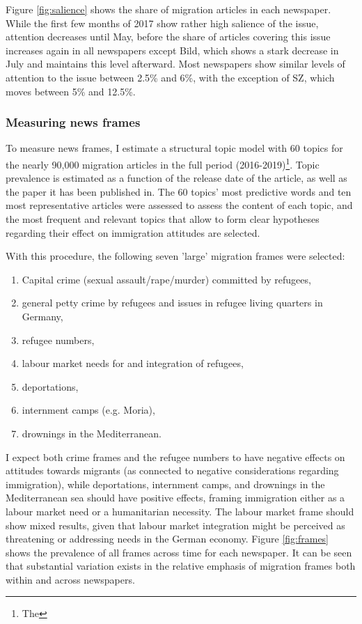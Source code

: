 \documentclass{article}
\begin{document}
Figure \ref{fig:salience} shows the share of migration articles in each newspaper. While the first few months of 2017 show rather high salience of the issue, attention decreases until May, before the share of articles covering this issue increases again in all newspapers except Bild, which shows a stark decrease in July and maintains this level afterward. Most newspapers show similar levels of attention to the issue between 2.5\% and 6\%, with the exception of SZ, which moves between 5\% and 12.5\%.

\subsubsection{Measuring news frames}

To measure news frames, I estimate a structural topic model with 60 topics for the nearly 90,000 migration articles in the full period (2016-2019)\footnote{The }. Topic prevalence is estimated as a function of the release date of the article, as well as the paper it has been published in. The 60 topics' most predictive words and ten most representative articles were assessed to assess the content of each topic, and the most frequent and relevant topics that allow to form clear hypotheses regarding their effect on immigration attitudes are selected. 

With this procedure, the following seven 'large' migration frames were selected:

\begin{enumerate}
    \item Capital crime (sexual assault/rape/murder) committed by refugees, 
    \item general petty crime by refugees and issues in refugee living quarters in Germany,
    \item refugee numbers,
    \item labour market needs for and integration of refugees,
    \item deportations,
    \item internment camps (e.g. Moria),
    \item drownings in the Mediterranean.
\end{enumerate}

I expect both crime frames and the refugee numbers to have negative effects on attitudes towards migrants (as connected to negative considerations regarding immigration), while deportations, internment camps, and drownings in the Mediterranean sea should have positive effects, framing immigration either as a labour market need or a humanitarian necessity. The labour market frame should show mixed results, given that labour market integration might be perceived as threatening or addressing needs in the German economy. Figure \ref{fig:frames} shows the prevalence of all frames across time for each newspaper. It can be seen that substantial variation exists in the relative emphasis of migration frames both within and across newspapers.
\end{document}
